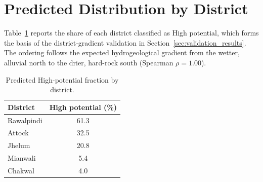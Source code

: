 \section{Predicted Distribution by District}
\label{app:district}

Table~\ref{tab:district_high} reports the share of each district classified as
High potential, which forms the basis of the district-gradient validation in
Section~\ref{sec:validation_results}. The ordering follows the expected
hydrogeological gradient from the wetter, alluvial north to the drier, hard-rock
south (Spearman $\rho = 1.00$).

\begin{table}[H]
\centering
\caption{Predicted High-potential fraction by district.}
\label{tab:district_high}
\begin{tabular}{lc}
\toprule
District & High potential (\%) \\
\midrule
Rawalpindi & 61.3 \\
Attock     & 32.5 \\
Jhelum     & 20.8 \\
Mianwali   & 5.4 \\
Chakwal    & 4.0 \\
\bottomrule
\end{tabular}
\end{table}
